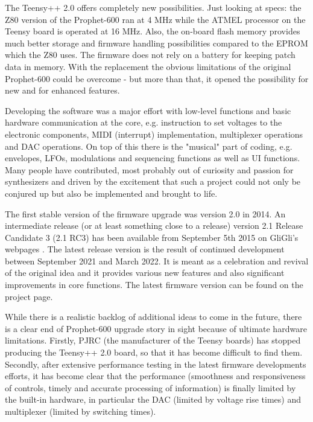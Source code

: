 \documentclass[landscape, 11pt, oneside, twoside]{report}
\newenvironment{flowtext}{\addmargin[0cm]{0cm}}{\endaddmargin} %
\begin{document}
\begin{flowtext}
The Teensy++ 2.0 offers completely new possibilities. Just looking at specs: the Z80 version of the Prophet-600 ran at 4 MHz while the ATMEL processor on the Teensy board is operated at 16 MHz. Also, the on-board flash memory provides much better storage and firmware handling possibilities compared to the EPROM which the Z80 uses. The firmware does not rely on a battery for keeping patch data in memory. With the replacement the obvious limitations of the original Prophet-600 could be overcome - but more than that, it opened the possibility for new and for enhanced features. 

Developing the software was a major effort with low-level functions and basic hardware communication at the core, e.g. instruction to set voltages to the electronic components, MIDI (interrupt) implementation, multiplexer operations and DAC operations. On top of this there is the "musical" part of coding, e.g. envelopes, LFOs, modulations and sequencing functions as well as UI functions. Many people have contributed, most probably out of curiosity and passion for synthesizers and driven by the excitement that such a project could not only be conjured up but also be implemented and brought to life. 

The first stable version of the firmware upgrade was version 2.0 in 2014. An intermediate release (or at least something close to a release) version 2.1 Release Candidate 3 (2.1 RC3) has been available from September 5th 2015 on GliGli's webpages \cite{gligli}. The latest release version \version is the result of continued development between September 2021 and March 2022. It is meant as a celebration and revival of the original idea and it provides various new features and also significant improvements in core functions. The latest firmware version can be found on the project page\cite{newversion}.

While there is a realistic backlog of additional ideas to come in the future, there is a clear end of Prophet-600 upgrade story in sight because of ultimate hardware limitations. Firstly, PJRC (the manufacturer of the Teensy boards) has stopped producing the Teensy++ 2.0 board, so that it has become difficult to find them. Secondly, after extensive performance testing in the latest firmware developments efforts, it has become clear that the performance (smoothness and responsiveness of controls, timely and accurate processing of information) is finally limited by the built-in hardware, in particular the DAC (limited by voltage rise times) and multiplexer (limited by switching times). 


\end{flowtext}
\end{document}
